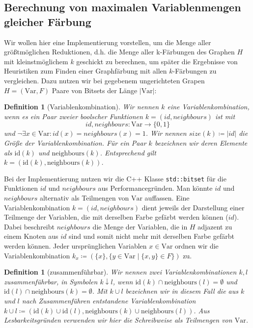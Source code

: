 \documentclass[a4paper]{article}
\newtheorem{definition}[satz]{Definition} %
\theoremstyle{nonumberplain}
\begin{document}
\subsection{Berechnung von maximalen Variablenmengen gleicher Färbung}

Wir wollen hier eine Implementierung vorstellen, um die Menge aller größtmög\-lich\-en Reduktionen, d.h. die Menge aller k-Färbungen des Graphen $H$ mit kleinst\-mög\-lich\-em $k$ geschickt zu berechnen, um später die Ergebnisse von Heuristiken zum Finden einer Graphfärbung mit allen $k$-Färbungen zu vergleichen.
Dazu nutzen wir bei gegebenem ungerichteten Grapen $H=(\mathrm{Var}, F)$ Paare von Bitsets der Länge $|\mathrm{Var}|$:

\begin{definition}[Variablenkombination]
	Wir nennen $k$ eine \emph{Variablenkombination}, wenn es ein Paar zweier boolscher Funktionen $k = (id, neighbours)$ ist mit
	\[id, neighbours : \mbox{Var} \to \{0,1\}
	\]
	 und $\neg \exists x \in \mathrm{Var} : id(x) = neighbours(x) = 1$. Wir nennen $size(k) \coloneqq |id|$ die \emph{Größe} der Variablenkombination.
	 Für ein Paar $k$ bezeichnen wir deren Elemente als $\mathrm{id}(k)$ und $\mathrm{neighbours}(k)$. Entsprechend gilt $k = (\mathrm{id}(k),\mathrm{neighbours}(k))$.
\end{definition}

Bei der Implementierung nutzen wir die C++ Klasse \texttt{std::bitset} für die Funktionen $id$ und $neighbours$ aus Performancegründen. Man könnte $id$ und $neighbours$ alternativ als Teilmengen von $\mathrm{Var}$ auffassen. Eine Variablenkombination $k = (id, neighbours)$ dient jeweils der Darstellung einer Teilmenge der Variablen, die mit derselben Farbe gefärbt werden können ($id$). Dabei beschreibt $neighbours$ die Menge der Variablen, die in $H$ adjazent zu einem Knoten aus $id$ sind und somit nicht mehr mit derselben Farbe gefärbt werden können.
Jeder ursprünglichen Variablen $x \in \mathrm{Var}$ ordnen wir die Variablenkombination $k_x \coloneqq (\{x\}, \{y \in \mathrm{Var} \mid \{x,y\} \in F\})$ zu.

\begin{definition}[zusammenführbar]
	Wir nennen zwei Variablenkombinationen $k, l$ \emph{zusammenführbar}, in Symbolen $k \downarrow l$, wenn $\mathrm{id}(k) \cap \mathrm{neighbours}(l) = \emptyset$ und $\mathrm{id}(l) \cap \mathrm{neighbours}(k) = \emptyset$. Mit $k \cup l$ bezeichnen wir in diesem Fall die aus $k$ und $l$ nach Zusammenführen entstandene Variablenkombination  $k \cup l \coloneqq (\mathrm{id}(k) \cup \mathrm{id}(l), \mathrm{neighbours}(k) \cup \mathrm{neighbours}(l))$. Aus Lesbarkeitsgründen verwenden wir hier die Schreibweise als Teilmengen von $\mathrm{Var}$.
\end{definition}
\end{document}
